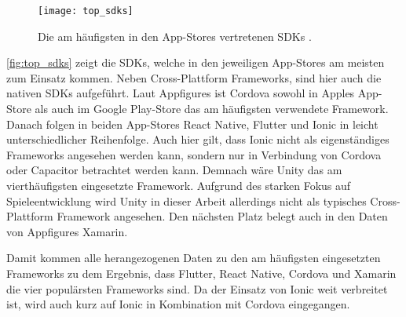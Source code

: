 \begin{figure}[ht]
  \centering
  \texttt{[image: top\_sdks]}
  \caption{Die am häufigsten in den App-Stores vertretenen \acp{SDK} \cite{Appfigures_TopSDKs}.}
  \label{fig:top_sdks}  
\end{figure}

\autoref{fig:top_sdks} zeigt die \acp{SDK}, welche in den jeweiligen App-Stores am meisten zum Einsatz kommen.
Neben Cross-Plattform Frameworks, sind hier auch die nativen \acp{SDK} aufgeführt.
Laut Appfigures \cite{Appfigures_TopSDKs} ist Cordova sowohl in Apples App-Store als auch im Google Play-Store das am häufigsten verwendete Framework.
Danach folgen in beiden App-Stores React Native, Flutter und Ionic in leicht unterschiedlicher Reihenfolge.
Auch hier gilt, dass Ionic nicht als eigenständiges Frameworks angesehen werden kann, sondern nur in Verbindung von Cordova oder Capacitor betrachtet werden kann.
Demnach wäre Unity das am vierthäufigsten eingesetzte Framework.
Aufgrund des starken Fokus auf Spieleentwicklung \cite{Unity} wird Unity in dieser Arbeit allerdings nicht als typisches Cross-Plattform Framework angesehen.
Den nächsten Platz belegt auch in den Daten von Appfigures Xamarin.

Damit kommen alle herangezogenen Daten zu den am häufigsten eingesetzten Frameworks zu dem Ergebnis, dass Flutter, React Native, Cordova und Xamarin die vier populärsten Frameworks sind.
Da der Einsatz von Ionic weit verbreitet ist, wird auch kurz auf Ionic in Kombination mit Cordova eingegangen.





